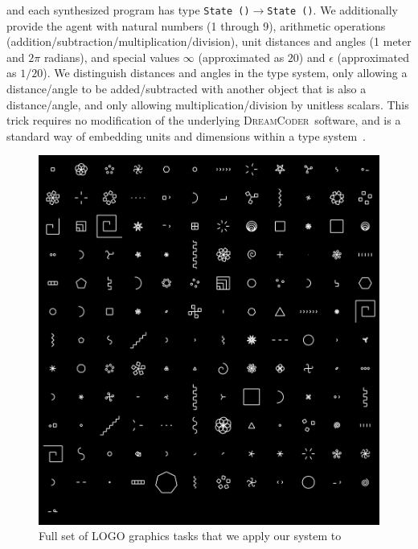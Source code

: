 \documentclass{article}
\newcommand{\system}{\textsc{DreamCoder}~}
\newcommand{\code}[1]{{\footnotesize\texttt{#1}}}
\begin{document}
and each synthesized program has type \code{State ()}$\to$\code{State ()}. We additionally provide the agent with natural numbers (1 through 9), arithmetic operations (addition/subtraction/multiplication/division), unit distances and angles (1 meter and $2\pi$ radians), and special values $\infty$ (approximated as $20$) and $\epsilon$ (approximated as $1/20$). We distinguish distances and angles in the type system, only allowing a distance/angle to be added/subtracted with another object that is also a distance/angle, and only allowing multiplication/division by unitless scalars. This trick requires no modification of the underlying \system software, and is a standard way of embedding units and dimensions within a type system~\cite{fsunits}.


\begin{figure}
  \includegraphics[width = \textwidth]{figures/fullLogo.png}
  \caption{Full set of LOGO graphics tasks that we apply our system to}\label{everyLogoTask}
\end{figure}
\end{document}
